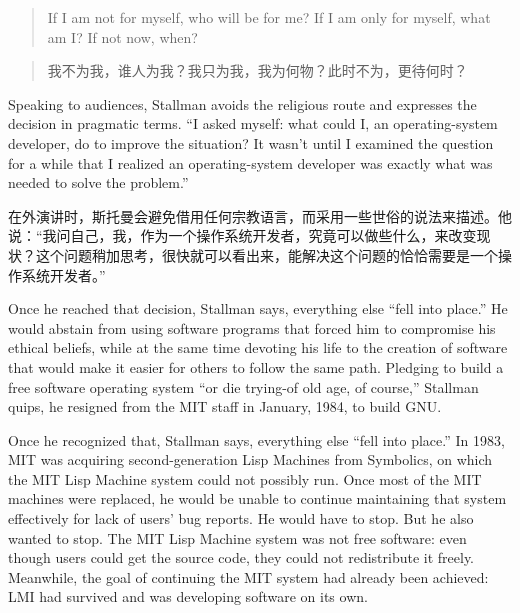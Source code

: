 \ifdefined\eng
\begin{quote}
If I am not for myself, who will be for me? If I am only for myself, what am I? If not now, when?
\end{quote}
\fi

\ifdefined\chs
\begin{quote}
我不为我，谁人为我？我只为我，我为何物？此时不为，更待何时？
\end{quote}
\fi

\ifdefined\eng
Speaking to audiences, Stallman avoids the religious route and expresses the decision in pragmatic terms. ``I asked myself: what could I, an operating-system developer, do to improve the situation? It wasn't until I examined the question for a while that I realized an operating-system developer was exactly what was needed to solve the problem.''
\fi

\ifdefined\chs
在外演讲时，斯托曼会避免借用任何宗教语言，而采用一些世俗的说法来描述。他说：``我问自己，我，作为一个操作系统开发者，究竟可以做些什么，来改变现状？这个问题稍加思考，很快就可以看出来，能解决这个问题的恰恰需要是一个操作系统开发者。''
\fi

\ifdefined\eng
\ifdefined\vone
Once he reached that decision, Stallman says, everything else ``fell into place.'' He would abstain from using software programs that forced him to compromise his ethical beliefs, while at the same time devoting his life to the creation of software that would make it easier for others to follow the same path. Pledging to build a free software operating system ``or die trying-of old age, of course,'' Stallman quips, he resigned from the MIT staff in January, 1984, to build GNU.
\fi

\ifdefined\vtwo
Once he recognized that, Stallman says, everything else ``fell into place.'' In 1983, MIT was acquiring second-generation Lisp Machines from Symbolics, on which the MIT Lisp Machine system could not possibly run.  Once most of the MIT machines were replaced, he would be unable to continue maintaining that system effectively for lack of users' bug reports.  He would have to stop.  But he also wanted to stop.  The MIT Lisp Machine system was not free software: even though users could get the source code, they could not redistribute it freely.  Meanwhile, the goal of continuing the MIT system had already been achieved: LMI had survived and was developing software on its own.
\fi
\fi

